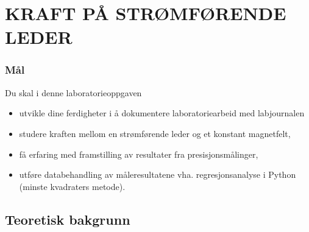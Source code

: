 \documentclass[../Elmag-labhefte-2020.tex]{subfiles}
\begin{document}
\chapter{KRAFT PÅ STRØMFØRENDE LEDER\label{ch.kraft} }

\subsection*{Mål}

Du skal i denne laboratorieoppgaven
%
\begin{itemize}
 \item utvikle dine ferdigheter i å dokumentere laboratoriearbeid med labjournalen
    \item studere kraften mellom en strømførende leder og et konstant magnetfelt, 
    \item få erfaring med framstilling av resultater fra presisjonsmålinger, 
    \item utføre databehandling av måleresultatene vha. regresjonsanalyse i Python (minste kvadraters metode). %
\end{itemize}
%


\section{Teoretisk bakgrunn}



\end{document}

